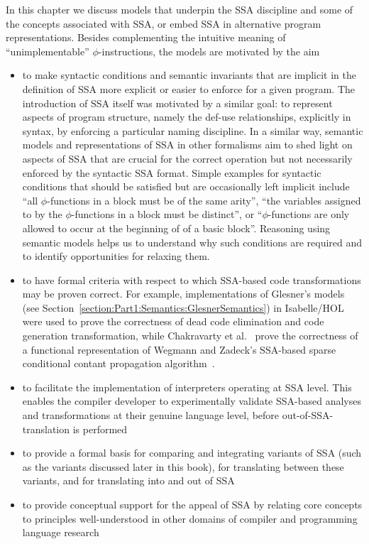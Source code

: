 \label{section:Part1:Semantics:Intro}
In this chapter we discuss models that underpin the SSA discipline and
some of the concepts associated with SSA, or embed SSA in alternative
program representations. Besides complementing the intuitive meaning
of ``unimplementable'' $\phi$-instructions, the models are motivated
by the aim
\begin{itemize}
\item to make syntactic conditions and semantic invariants that are
  implicit in the definition of SSA more explicit or easier to enforce
  for a given program. The introduction of SSA itself was motivated by
  a similar goal: to represent aspects of program structure, namely
  the def-use relationships, explicitly in syntax, by enforcing a
  particular naming discipline. In a similar way, semantic models and
  representations of SSA in other formalisms aim to shed light on
  aspects of SSA that are crucial for the correct operation but not
  necessarily enforced by the syntactic SSA format. Simple examples
  for syntactic conditions that should be satisfied but are
  occasionally left implicit include ``all $\phi$-functions in a block
  must be of the same arity'', ``the variables assigned to by the
  $\phi$-functions in a block must be distinct'', or
  ``$\phi$-functions are only allowed to occur at the beginning of of
  a basic block''. Reasoning using semantic models helps us to
  understand why such conditions are required and to identify
  opportunities for relaxing them.
\item to have formal criteria with respect to which SSA-based code
  transformations may be proven correct. For example, implementations
  of Glesner's models (see
  Section~\ref{section:Part1:Semantics:GlesnerSemantics}) in
  Isabelle/HOL were used to prove the correctness of dead code
  elimination and code generation transformation, while Chakravarty et
  al.~\cite{ChakravartyKZ:COCV03} prove the correctness of a
  functional representation of Wegmann and Zadeck's SSA-based sparse
  conditional contant propagation
  algorithm~\cite{WegmannZ:Toplas1991}.
\item to facilitate the implementation of interpreters operating at
  SSA level. This enables the compiler developer to experimentally
  validate SSA-based analyses and transformations at their genuine
  language level, before out-of-SSA-translation is performed
\item to provide a formal basis for comparing and integrating variants
  of SSA (such as the variants discussed later in this book), for
  translating between these variants, and for translating into and
  out of SSA
\item to provide conceptual support for the appeal of SSA by relating
  core concepts to principles well-understood in other domains of
  compiler and programming language research
\end{itemize}

